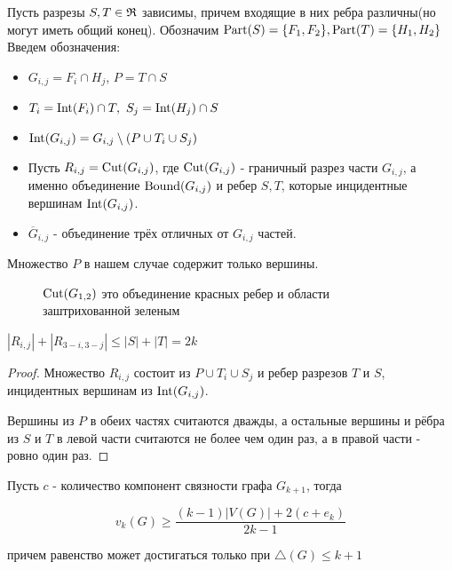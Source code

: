 \begin{prop}
	Пусть разрезы $S, T \in \mathfrak{R}$ зависимы, причем входящие в них ребра различны(но могут иметь общий конец).
	Обозначим $\operatorname{Part}(S) = \{F_1, F_2\}, \operatorname{Part}(T) = \{H_1, H_2\}$
	Введем обозначения:

	\begin{itemize}
		\item $G_{i,j} = F_i \cap H_j$, $P = T \cap S$
		\item  $T_i = \operatorname{Int}(F_i) \cap T, \ S_j = \operatorname{Int}(H_j) \cap S$
		\item $\operatorname{Int}(G_{i, j}) = G_{i, j} \setminus (P \cup T_i \cup S_j)$
		\item Пусть  $R_{i, j} = \operatorname{Cut}(G_{i, j})$, где $\operatorname{Cut}(G_{i, j})$ - граничный разрез части  $G_{i, j}$, а именно объединение  $\operatorname{Bound}(G_{i, j})$ и ребер  $S, T$, которые инцидентные вершинам  $\operatorname{Int}(G_{i, j})$.
		\item $\overline G_{i, j}$ - объединение трёх отличных от  $G_{i, j}$ частей.
	\end{itemize}

	Множество $P$ в нашем случае содержит только вершины.

\end{prop}

\begin{figure}[ht]
    \centering
	\caption{$\operatorname{Cut}(G_{1, 2})$ это объединение красных ребер и области заштрихованной зеленым}
    \label{fig:prop_dependent_cuts_k_connected_graph}
\end{figure}

\begin{lm}[Лемма 3.2] \label{lemma:3_2}
	$|R_{i, j}| + |R_{3 - i, 3 - j}| \leqslant |S| + |T| = 2k$
\end{lm}

\begin{proof}
	Множество $R_{i, j}$ состоит из  $P \cup T_i \cup S_j$ и ребер разрезов  $T$ и  $S$, инцидентных вершинам из  $\operatorname{Int}(G_{i, j})$.

	Вершины из $P$ в обеих частях считаются дважды, а остальные вершины и рёбра из  $S$ и  $T$ в левой части считаются не более чем один раз, а в правой части - ровно один раз.
\end{proof}

\begin{lm}[Лемма 3.3] \label{lemma:3_3}
	Пусть $c$ - количество компонент связности графа  $G_{k + 1}$, тогда

	\[
		v_k(G) \geqslant \frac{(k - 1)|V(G)| + 2(c + e_k)}{2k - 1}
	\] 

	причем равенство может достигаться только при $\triangle (G) \leqslant k + 1$

\end{lm}

